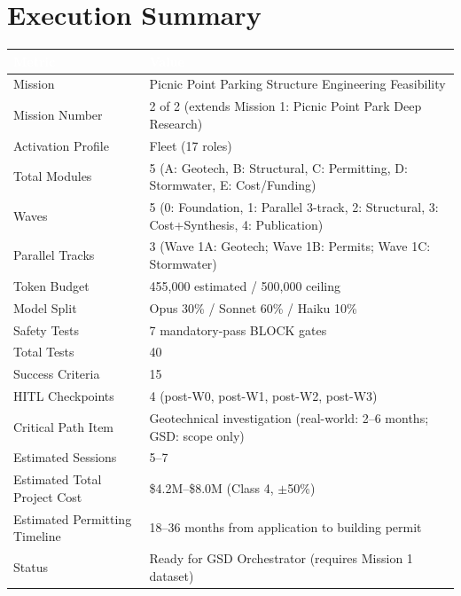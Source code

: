 \documentclass[11pt,letterpaper]{article}
\newcommand{\tableheader}[1]{\textbf{\sffamily\textcolor{white}{#1}}}
\begin{document}
\section{Execution Summary}

\begin{center}
\begin{tabularx}{\textwidth}{L{4.5cm}X}
\toprule
{}
\tableheader{Metric} & \tableheader{Value} \\
\midrule
Mission & Picnic Point Parking Structure Engineering Feasibility \\
Mission Number & 2 of 2 (extends Mission 1: Picnic Point Park Deep Research) \\
Activation Profile & Fleet (17 roles) \\
Total Modules & 5 (A: Geotech, B: Structural, C: Permitting, D: Stormwater, E: Cost/Funding) \\
Waves & 5 (0: Foundation, 1: Parallel 3-track, 2: Structural, 3: Cost+Synthesis, 4: Publication) \\
Parallel Tracks & 3 (Wave 1A: Geotech; Wave 1B: Permits; Wave 1C: Stormwater) \\
Token Budget & 455,000 estimated / 500,000 ceiling \\
Model Split & Opus 30\% / Sonnet 60\% / Haiku 10\% \\
Safety Tests & 7 mandatory-pass BLOCK gates \\
Total Tests & 40 \\
Success Criteria & 15 \\
HITL Checkpoints & 4 (post-W0, post-W1, post-W2, post-W3) \\
Critical Path Item & Geotechnical investigation (real-world: 2--6 months; GSD: scope only) \\
Estimated Sessions & 5--7 \\
Estimated Total Project Cost & \$4.2M--\$8.0M (Class 4, $\pm$50\%) \\
Estimated Permitting Timeline & 18--36 months from application to building permit \\
Status & Ready for GSD Orchestrator (requires Mission 1 dataset) \\
\bottomrule
\end{tabularx}
\end{center}

\vspace{2em}
\end{document}
